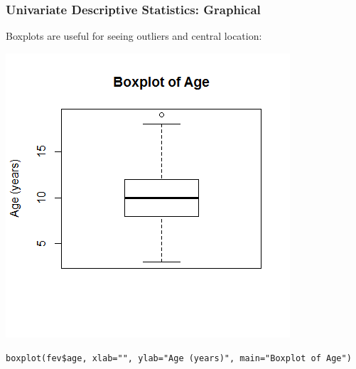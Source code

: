 \documentclass[12pt, 
hyperref={colorlinks=true, linkcolor=blue, urlcolor=cyan}]{beamer}
\begin{document}
\begin{frame}
\frametitle{Univariate Descriptive Statistics: Graphical}

Boxplots are useful for seeing outliers and central location:\vspace{-0.8cm}

\center \includegraphics[height=0.7\textheight]{./boxplot-age}

\vspace{-1cm} \begin{scriptsize} \texttt{boxplot(fev\$age, xlab="", ylab="Age (years)", main="Boxplot of Age")} \end{scriptsize}

\end{frame}
\end{document}
